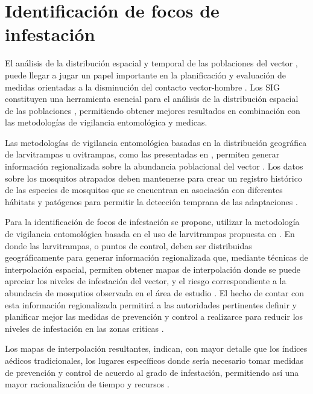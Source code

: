 \section{Identificación de focos de infestación}
\label{sec:cap4-identificacion-focos}

El análisis de la distribución espacial y temporal de las poblaciones del vector
\cite{dengueUruguayCap1, cenaprece2013,nino2008uso}, puede llegar a jugar un papel importante en
la planificación y evaluación de medidas orientadas a la disminución del contacto vector-hombre
\cite{nino2008uso}. Los SIG constituyen una herramienta esencial para el análisis de la
distribución espacial de las poblaciones \cite{vgomesAegis2001,petric2012surveillance},
permitiendo obtener mejores resultados en combinación con las metodologías de vigilancia
entomológica y medicas\cite{petric2012surveillance}.

Las metodologías de vigilancia entomológica basadas en la distribución geográfica de larvitrampas
u ovitrampas, como las presentadas en
\cite{NINO2011,petric2012surveillance, journal.pone.0054167,nino2008uso}, permiten generar
información regionalizada sobre la abundancia poblacional del vector \cite{NINO2011}. Los datos
sobre los mosquitos atrapados deben mantenerse para crear un registro histórico de las especies de
mosquitos que se encuentran en asociación con diferentes hábitats y patógenos para permitir la
detección temprana de las adaptaciones \cite{petric2012surveillance}.

Para la identificación de focos de infestación se propone, utilizar la metodología de vigilancia
entomológica basada en el uso de larvitrampas propuesta en \cite{NINO2011}. En donde las
larvitrampas, o puntos de control, deben ser distribuidas geográficamente para generar información
regionalizada que, mediante técnicas de interpolación espacial, permiten obtener mapas de
interpolación donde se puede apreciar los niveles de infestación del vector, y el riesgo
correspondiente a la abundacia de mosqutios observada en el área de estudio \cite{NINO2011, nino2008uso, journal.pone.0054167, albierispatial}. El hecho de contar con esta información
regionalizada permitirá a las autoridades pertinentes definir y planificar mejor las medidas de
prevención y control a realizarce para reducir los niveles de infestación en las zonas criticas
\cite{NINO2011, nino2008uso, petric2012surveillance}.

Los mapas de interpolación resultantes, indican, con mayor detalle que los índices aédicos
tradicionales, los lugares específicos donde sería necesario tomar medidas de prevención y
control de acuerdo al grado de infestación, permitiendo así una mayor racionalización de tiempo y
recursos \cite{NINO2011}.

